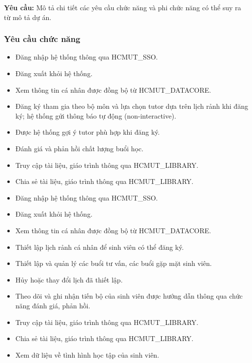 \textbf{Yêu cầu:} Mô tả chi tiết các yêu cầu chức năng và phi chức năng có thể suy ra từ mô tả dự án.



\subsubsection{Yêu cầu chức năng}
\begin{itemize}
	\item Đăng nhập hệ thống thông qua HCMUT\_SSO.
	\item Đăng xuất khỏi hệ thống.
	\item Xem thông tin cá nhân được đồng bộ từ HCMUT\_DATACORE.
	\item Đăng ký tham gia theo bộ môn và lựa chọn tutor dựa trên lịch rảnh khi đăng ký; hệ thống gửi thông báo tự động (non-interactive).
	\item Được hệ thống gợi ý tutor phù hợp khi đăng ký.
	\item Đánh giá và phản hồi chất lượng buổi học.
	\item Truy cập tài liệu, giáo trình thông qua HCMUT\_LIBRARY.
	\item Chia sẻ tài liệu, giáo trình thông qua HCMUT\_LIBRARY.
\end{itemize}

\begin{itemize}
	\item Đăng nhập hệ thống thông qua HCMUT\_SSO.
	\item Đăng xuất khỏi hệ thống.
	\item Xem thông tin cá nhân được đồng bộ từ HCMUT\_DATACORE.
	\item Thiết lập lịch rảnh cá nhân để sinh viên có thể đăng ký.
	\item Thiết lập và quản lý các buổi tư vấn, các buổi gặp mặt sinh viên.
	\item Hủy hoặc thay đổi lịch đã thiết lập.
	\item Theo dõi và ghi nhận tiến bộ của sinh viên được hướng dẫn thông qua chức năng đánh giá, phản hồi.
	\item Truy cập tài liệu, giáo trình thông qua HCMUT\_LIBRARY.
	\item Chia sẻ tài liệu, giáo trình thông qua HCMUT\_LIBRARY.
\end{itemize}
\begin{itemize}
	\item Xem dữ liệu về tình hình học tập của sinh viên.
\end{itemize}

